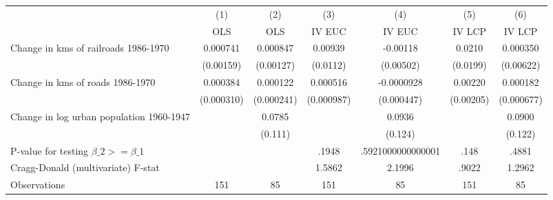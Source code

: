 {
\def\sym#1{\ifmmode^{#1}\else\(^{#1}\)\fi}
\begin{tabular}{l*{6}{c}}
\hline\hline
                &\multicolumn{1}{c}{(1)}&\multicolumn{1}{c}{(2)}&\multicolumn{1}{c}{(3)}&\multicolumn{1}{c}{(4)}&\multicolumn{1}{c}{(5)}&\multicolumn{1}{c}{(6)}\\
                &\multicolumn{1}{c}{OLS}&\multicolumn{1}{c}{OLS}&\multicolumn{1}{c}{IV EUC}&\multicolumn{1}{c}{IV EUC}&\multicolumn{1}{c}{IV LCP}&\multicolumn{1}{c}{IV LCP}\\
\hline
Change in kms of railroads 1986-1970& 0.000741         & 0.000847         &  0.00939         & -0.00118         &   0.0210         & 0.000350         \\
                &(0.00159)         &(0.00127)         & (0.0112)         &(0.00502)         & (0.0199)         &(0.00622)         \\
[1em]
Change in kms of roads 1986-1970& 0.000384         & 0.000122         & 0.000516         &-0.0000928         &  0.00220         & 0.000182         \\
                &(0.000310)         &(0.000241)         &(0.000987)         &(0.000447)         &(0.00205)         &(0.000677)         \\
[1em]
Change in log urban population 1960-1947&                  &   0.0785         &                  &   0.0936         &                  &   0.0900         \\
                &                  &  (0.111)         &                  &  (0.124)         &                  &  (0.122)         \\
\hline
P-value for testing $\beta\_{2} >= \beta\_{1}$&                  &                  &    .1948         &.5921000000000001         &     .148         &    .4881         \\
Cragg-Donald (multivariate) F-stat&                  &                  &   1.5862         &   2.1996         &    .9022         &   1.2962         \\
Observations    &      151         &       85         &      151         &       85         &      151         &       85         \\
\hline\hline
\end{tabular}
}
